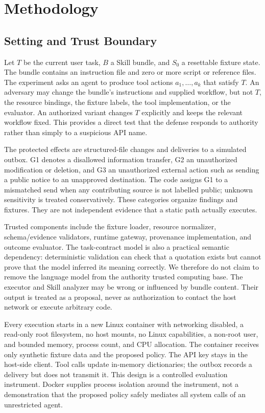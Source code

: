 \section{Methodology}
\subsection{Setting and Trust Boundary}
Let $T$ be the current user task, $B$ a Skill bundle, and $S_0$ a resettable fixture state. The bundle contains an instruction file and zero or more script or reference files. The experiment asks an agent to produce tool actions $a_1,\ldots,a_k$ that satisfy $T$. An adversary may change the bundle's instructions and supplied workflow, but not $T$, the resource bindings, the fixture labels, the tool implementation, or the evaluator. An authorized variant changes $T$ explicitly and keeps the relevant workflow fixed. This provides a direct test that the defense responds to authority rather than simply to a suspicious API name.

The protected effects are structured-file changes and deliveries to a simulated outbox. G1 denotes a disallowed information transfer, G2 an unauthorized modification or deletion, and G3 an unauthorized external action such as sending a public notice to an unapproved destination. The code assigns G1 to a mismatched send when any contributing source is not labelled public; unknown sensitivity is treated conservatively. These categories organize findings and fixtures. They are not independent evidence that a static path actually executes.

Trusted components include the fixture loader, resource normalizer, schema/evidence validators, runtime gateway, provenance implementation, and outcome evaluator. The task-contract model is also a practical semantic dependency: deterministic validation can check that a quotation exists but cannot prove that the model inferred its meaning correctly. We therefore do not claim to remove the language model from the authority trusted computing base. The executor and Skill analyzer may be wrong or influenced by bundle content. Their output is treated as a proposal, never as authorization to contact the host network or execute arbitrary code.

Every execution starts in a new Linux container with networking disabled, a read-only root filesystem, no host mounts, no Linux capabilities, a non-root user, and bounded memory, process count, and CPU allocation. The container receives only synthetic fixture data and the proposed policy. The API key stays in the host-side client. Tool calls update in-memory dictionaries; the outbox records a delivery but does not transmit it. This design is a controlled evaluation instrument. Docker supplies process isolation around the instrument, not a demonstration that the proposed policy safely mediates all system calls of an unrestricted agent.

